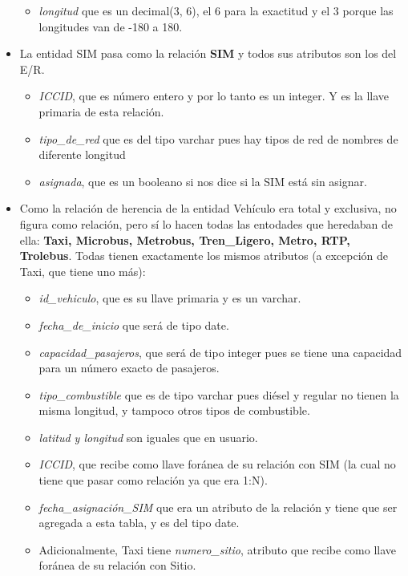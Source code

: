 \documentclass[11pt]{article}
\begin{document}
\begin{itemize}
\begin{itemize}
    \item \textit{longitud} que es un decimal(3, 6), el 6 para la exactitud y el 3 porque las longitudes van de -180 a 180.
    \end{itemize}   
\item La entidad SIM pasa como la relación \textbf{SIM} y todos sus atributos son los del E/R.
    \begin{itemize}
    \item \textit{ICCID}, que es número entero y por lo tanto es un integer. Y es la llave primaria de esta relación.
    \item \textit{tipo\_de\_red} que es del tipo varchar pues hay tipos de red de nombres de diferente longitud 
    \item \textit{asignada}, que es un booleano si nos dice si la SIM está sin asignar.
    \end{itemize}   
\item Como la relación de herencia de la entidad Vehículo era total y exclusiva, no figura como relación, pero sí lo hacen todas las entodades que heredaban de ella: \textbf{Taxi, Microbus, Metrobus, Tren\_Ligero, Metro, RTP, Trolebus}. Todas tienen exactamente los mismos atributos (a excepción de Taxi, que tiene uno más):
    \begin{itemize}
    \item \textit{id\_vehiculo}, que es su llave primaria y es un varchar.
    \item \textit{fecha\_de\_inicio} que será de tipo date.
    \item \textit{capacidad\_pasajeros}, que será de tipo integer pues se tiene una capacidad para un número exacto de pasajeros.
    \item \textit{tipo\_combustible} que es de tipo varchar pues diésel y regular no tienen la misma longitud, y tampoco otros tipos de combustible. 
    \item \textit{latitud y longitud} son iguales que en usuario.
    \item \textit{ICCID}, que recibe como llave foránea de su relación con SIM (la cual no tiene que pasar como relación ya que era 1:N).
    \item \textit{fecha\_asignación\_SIM} que era un atributo de la relación y tiene que ser agregada a esta tabla, y es del tipo date.
    \item Adicionalmente, Taxi tiene \textit{numero\_sitio}, atributo que recibe como llave foránea de su relación con Sitio. 
    \end{itemize}   

\end{itemize}
\end{document}
